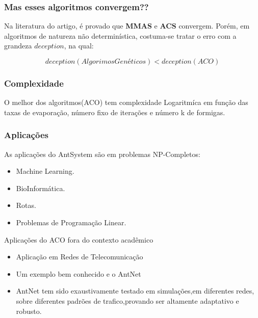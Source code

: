 \documentclass[compress]{beamer}
\begin{document}
\begin{frame}

\frametitle{Mas esses algoritmos convergem??}

Na literatura do artigo, é provado que \textbf{MMAS} e \textbf{ACS} convergem.
Porém, em algoritmos de natureza não determinística, costuma-se tratar o erro com a grandeza $deception$, na qual:

$$deception(Algorimos Genéticos)<deception(ACO)$$

\end{frame}



\begin{frame}
    \frametitle{Complexidade}
    O melhor dos algoritmos(ACO) tem complexidade Logaritmíca em função das taxas de evaporação, número fixo de iterações e número k de formigas. 
    
    
\end{frame}




\begin{frame}
    \frametitle{Aplicações}
    As aplicações do AntSystem são em problemas NP-Completos:

\begin{itemize}
  \item Machine Learning.
  \item BioInformática.
  \item Rotas.
  \item Problemas de Programação Linear.
\end{itemize}

    

\end{frame}








\begin{frame}{Aplicações do ACO fora do contexto acadêmico}

\begin{itemize}
    \item Aplicação em Redes de Telecomunicação
    \newline
    \item Um exemplo bem conhecido e o AntNet
    \newline
    \item AntNet tem sido exaustivamente testado em simulações,em diferentes redes, sobre diferentes padrões de trafico,provando ser altamente adaptativo e robusto.
\end{itemize}
\end{frame}
\end{document}
